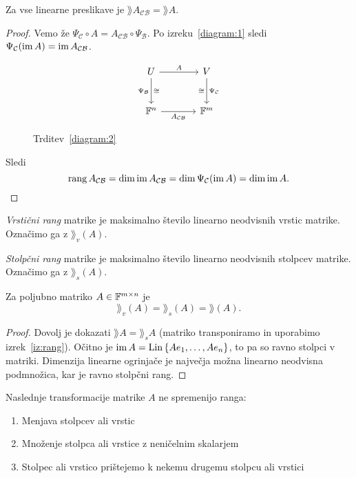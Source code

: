 \documentclass[12pt, a4paper]{article}
\begin{document}
\begin{trditev}\label{diagram:2}
Za vse linearne preslikave je $\rang A_{\mathcal{CB}}=\rang A$.
\end{trditev}

\begin{proof}
Vemo že $\Psi_{\mathcal{C}}\circ A=A_{\mathcal{CB}}\circ\Psi_{\mathcal{B}}$. Po izreku~\ref{diagram:1} sledi $\Psi_{\mathcal{C}}(\operatorname{im} A)=\operatorname{im} A_{\mathcal{CB}}$.

\begin{figure}[H]
\[
\begin{tikzcd}[column sep=large, row sep=large]
U
\arrow[r, "A"]
\arrow[d, "\Psi_{\mathcal{B}}"', "\cong"] & V \arrow[d, "\Psi_{\mathcal{C}}", "\cong"'] \\
\F^n \arrow[r, "A_{\mathcal{CB}}"'] & \F^m
\end{tikzcd}
\]
\caption{Trditev~\ref{diagram:2}}
\end{figure}

Sledi
\[
\operatorname{rang} A_{\mathcal{CB}}=\dim\operatorname{im} A_{\mathcal{CB}}=\dim \Psi_{\mathcal{C}}(\operatorname{im} A)=\dim\operatorname{im} A.\qedhere
\]
\end{proof}

\begin{definicija}
\emph{Vrstični rang} matrike je maksimalno število linearno neodvisnih vrstic matrike. Označimo ga z $\rang_v(A)$.

\emph{Stolpčni rang} matrike je maksimalno število linearno neodvisnih stolpcev matrike. Označimo ga z $\rang_s(A)$.
\end{definicija}

\begin{izrek}
Za poljubno matriko $A\in\mathbb{F}^{m\times n}$ je
\[
\rang_v(A)=\rang_s(A)=\rang(A).
\]
\end{izrek}

\begin{proof}
Dovolj je dokazati $\rang A=\rang_s A$ (matriko transponiramo in uporabimo izrek~\ref{iz:rang}). Očitno je $\operatorname{im} A=\operatorname{Lin}\left\{Ae_1,\dots,Ae_n\right\}$, to pa so ravno stolpci v matriki. Dimenzija linearne ogrinjače je največja možna linearno neodvisna podmnožica, kar je ravno stolpčni rang.
\end{proof}

Naslednje transformacije matrike $A$ ne spremenijo ranga:

\begin{enumerate}[label=\roman*)]
\item Menjava stolpcev ali vrstic
\item Množenje stolpca ali vrstice z neničelnim skalarjem
\item Stolpec ali vrstico prištejemo k nekemu drugemu stolpcu ali vrstici
\end{enumerate}
\end{document}
